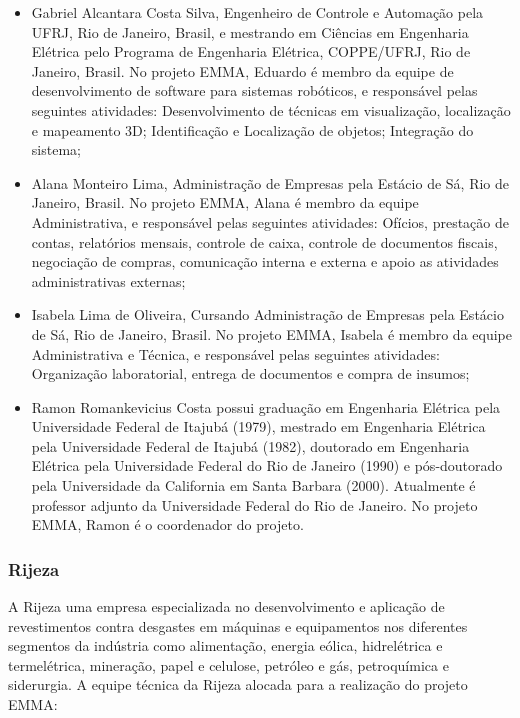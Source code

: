 \begin{itemize}
\item Gabriel Alcantara Costa Silva, Engenheiro de Controle e Automação pela
UFRJ, Rio de Janeiro, Brasil, e mestrando em Ciências em Engenharia Elétrica pelo
Programa de Engenharia Elétrica, COPPE/UFRJ, Rio de Janeiro, Brasil. No projeto
EMMA, Eduardo é membro da equipe de desenvolvimento de software para sistemas
robóticos, e responsável pelas seguintes atividades: Desenvolvimento de técnicas
em visualização, localização e mapeamento 3D; Identificação e
Localização de objetos; Integração do sistema;

\item Alana Monteiro Lima, Administração de Empresas pela Estácio de Sá, Rio de
Janeiro, Brasil. No projeto EMMA, Alana é membro da equipe Administrativa, e 
responsável pelas seguintes atividades: Ofícios, prestação de contas, 
relatórios mensais, controle de caixa, controle de documentos fiscais, 
negociação de compras, comunicação interna e externa e apoio as atividades 
administrativas externas;

\item Isabela Lima de Oliveira, Cursando Administração de Empresas pela Estácio
de Sá, Rio de Janeiro, Brasil. No projeto EMMA, Isabela é membro da 
equipe Administrativa e Técnica, e responsável pelas seguintes atividades: 
Organização laboratorial, entrega de documentos e compra de insumos;

\item Ramon Romankevicius Costa possui graduação em Engenharia Elétrica pela
Universidade Federal de Itajubá (1979), mestrado em Engenharia Elétrica pela 
Universidade Federal de Itajubá (1982), doutorado em Engenharia Elétrica pela
Universidade Federal do Rio de Janeiro (1990) e pós-doutorado pela Universidade 
da Cali\-fornia em Santa
Barbara (2000). Atualmente é professor adjunto da Universidade Federal do Rio de
Janeiro. No projeto EMMA, Ramon é o coordenador do projeto.

\end{itemize}


\subsubsection{Rijeza} 

A Rijeza uma empresa especializada no desenvolvimento e
aplicação de revestimentos contra desgastes em máquinas e equipamentos nos diferentes
segmentos da indústria como alimentação, energia eólica, hidrelétrica e
termelétrica, mineração, papel e celulose, petróleo e gás, petroquímica e siderurgia.
A equipe técnica da Rijeza alocada para a realização do projeto EMMA:

